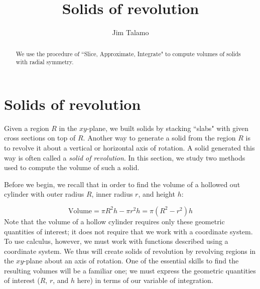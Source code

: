 \documentclass{ximera}
\author{Jim Talamo}
\title[Dig-In:]{Solids of revolution}
\begin{document}
\begin{abstract}
  We use the procedure of ``Slice, Approximate, Integrate" to compute volumes of solids with radial symmetry.
\end{abstract}
\maketitle


\section{Solids of revolution}

Given a region $R$ in the $xy$-plane, we built solids by stacking ``slabs" with given cross sections on top of $R$.  Another way to generate a solid from the region $R$ is to revolve it about a vertical or horizontal axis of rotation.  A solid generated this way is often called a \emph{solid of revolution}. In this section, we study two methods used to compute the volume of such a solid.

Before we begin, we recall that in order to find the volume of a hollowed out cylinder with outer radius $R$, inner radius $r$, and height $h$:

\begin{image}
\end{image}


\[
\textrm{Volume} = \pi R^2h-\pi r^2h=\pi(R^2-r^2)h 
\]
Note that the volume of a hollow cylinder requires only these geometric quantities of interest; it does not require that we work with a coordinate system.  To use calculus, however, we must work with functions described using a coordinate system.  We thus will create solids of revolution by revolving regions in the $xy$-plane about an axis of rotation.  One of the essential skills to find the resulting volumes will be a familiar one; we must express the geometric quantities of interest ($R$, $r$, and $h$ here) in terms of our variable of integration.
\end{document}
